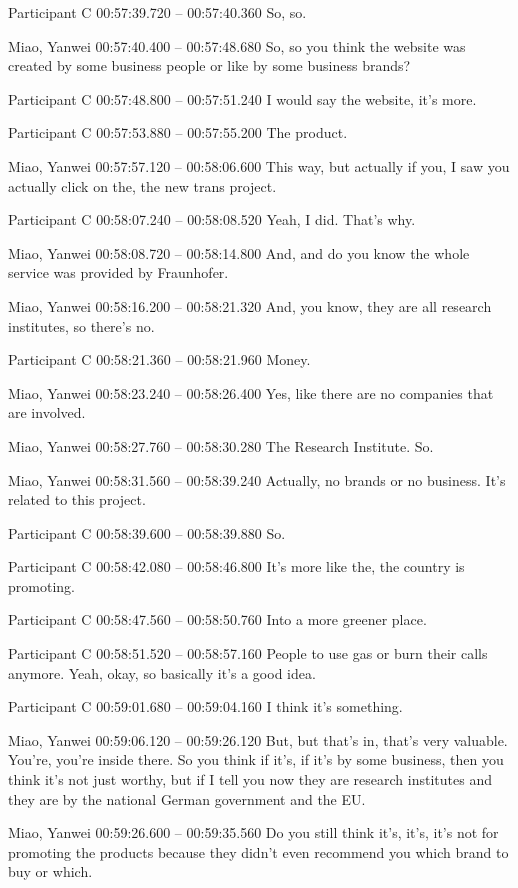 {Participant C 00:57:39.720 -- 00:57:40.360
So, so.

Miao, Yanwei 00:57:40.400 -- 00:57:48.680
So, so you think the website was created by some business people or like by some business brands?

Participant C 00:57:48.800 -- 00:57:51.240
I would say the website, it's more.

Participant C 00:57:53.880 -- 00:57:55.200
The product.

Miao, Yanwei 00:57:57.120 -- 00:58:06.600
This way, but actually if you, I saw you actually click on the, the new trans project.

Participant C 00:58:07.240 -- 00:58:08.520
Yeah, I did. That's why.

Miao, Yanwei 00:58:08.720 -- 00:58:14.800
And, and do you know the whole service was provided by Fraunhofer.

Miao, Yanwei 00:58:16.200 -- 00:58:21.320
And, you know, they are all research institutes, so there's no.

Participant C 00:58:21.360 -- 00:58:21.960
Money.

Miao, Yanwei 00:58:23.240 -- 00:58:26.400
Yes, like there are no companies that are involved.

Miao, Yanwei 00:58:27.760 -- 00:58:30.280
The Research Institute. So.

Miao, Yanwei 00:58:31.560 -- 00:58:39.240
Actually, no brands or no business. It's related to this project.

Participant C 00:58:39.600 -- 00:58:39.880
So.

Participant C 00:58:42.080 -- 00:58:46.800
It's more like the, the country is promoting.

Participant C 00:58:47.560 -- 00:58:50.760
Into a more greener place.

Participant C 00:58:51.520 -- 00:58:57.160
People to use gas or burn their calls anymore. Yeah, okay, so basically it's a good idea.

Participant C 00:59:01.680 -- 00:59:04.160
I think it's something.

Miao, Yanwei 00:59:06.120 -- 00:59:26.120
But, but that's in, that's very valuable. You're, you're inside there. So you think if it's, if it's by some business, then you think it's not just worthy, but if I tell you now they are research institutes and they are by the national German government and the EU.

Miao, Yanwei 00:59:26.600 -- 00:59:35.560
Do you still think it's, it's, it's not for promoting the products because they didn't even recommend you which brand to buy or which.

}

